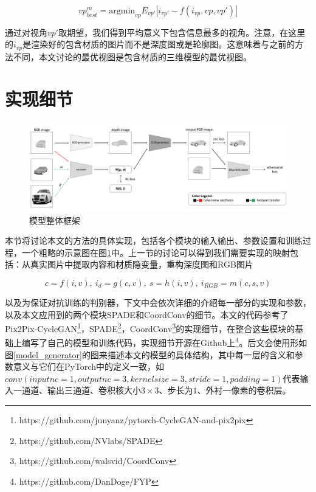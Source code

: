 \documentclass[UTF8,openany,AutoFakeBold,AutoFakeSlant,cs4size]{ctexbook}
\begin{document}
\begin{equation}
	vp_{best}^{m} = \mbox{argmin}_{vp} E_{vp'} | i_{vp'} - f(i_{vp}, vp, vp')|
\end{equation}


通过对视角$vp'$取期望，我们得到平均意义下包含信息最多的视角。注意，在这里的$i_{vp}$是渲染好的包含材质的图片而不是深度图或是轮廓图。这意味着与之前的方法不同，本文讨论的最优视图是包含材质的三维模型的最优视图。

\section{实现细节}

\begin{figure}
\centering
\includegraphics[width=\linewidth]{./images/banner.png}
\caption{模型整体框架}
\label{model_architecture}
\end{figure}

本节将讨论本文的方法的具体实现，包括各个模块的输入输出、参数设置和训练过程，一个粗略的示意图在图\ref{model_architecture}中。上一节的讨论可以得到我们需要实现的映射包括：从真实图片中提取内容和材质隐变量，重构深度图和RGB图片

\begin{equation}
	c = f(i, v),\ i_d = g(c, v),\ s = h(i ,v),\ i_{RGB} = m(c, s, v)
\end{equation}

以及为保证对抗训练的判别器，下文中会依次详细的介绍每一部分的实现和参数，以及本文应用到的两个模块SPADE\cite{park2019SPADE}和CoordConv\cite{NIPS2018_8169}的细节。本文的代码参考了Pix2Pix-CycleGAN\footnote{https://github.com/junyanz/pytorch-CycleGAN-and-pix2pix}，SPADE\footnote{https://github.com/NVlabs/SPADE}，CoordConv\footnote{https://github.com/walsvid/CoordConv}的实现细节，在整合这些模块的基础上编写了自己的模型和训练代码，实现细节开源在Github上\footnote{https://github.com/DanDoge/FYP}。后文会使用形如图\ref{model_generator}的图来描述本文的模型的具体结构，其中每一层的含义和参数意义与它们在PyTorch\cite{NEURIPS2019_9015}中的定义一致，如$conv(inputnc=1, outputnc=3, kernelsize=3, stride=1, padding=1)$代表输入一通道、输出三通道、卷积核大小$3 \times 3$、步长为$1$、外衬一像素的卷积层。
\end{document}
